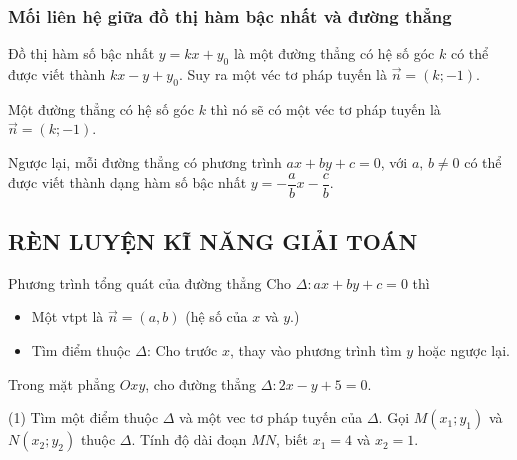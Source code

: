 \subsubsection{Mối liên hệ giữa đồ thị hàm bậc nhất và đường thẳng}
\begin{listEX}[1]
	\item [\ding{172}] Đồ thị hàm số bậc nhất $y=kx+y_0$ là một đường thẳng có hệ số góc $k$ có thể được viết thành $kx-y+y_0$. Suy ra một véc tơ pháp tuyến là $\vec{n}=(k;-1)$.
	\begin{boxdn}
		 Một đường thẳng có hệ số góc $k$ thì nó sẽ có một véc tơ pháp tuyến là $\vec{n}=(k;-1)$.
	\end{boxdn}
	\item [\ding{173}] Ngược lại, mỗi đường thẳng có phương trình $ax+by+c=0$, với $a,\,b \ne 0$ có thể được viết thành dạng hàm số bậc nhất $y=-\dfrac{a}{b}x-\dfrac{c}{b}$.
\end{listEX}
\subsection{RÈN LUYỆN KĨ NĂNG GIẢI TOÁN}

\begin{dang}{Phương trình tổng quát của đường thẳng}
	 Cho $\Delta \colon ax+by+c=0$ thì
	\begin{itemize}
		\item [$\bullet$] Một vtpt là $\overrightarrow{n}=(a,b)$ (hệ số của $x$ và $y$.)
		\item [$\bullet$] Tìm điểm thuộc $\Delta$: Cho trước $x$, thay vào phương trình tìm $y$ hoặc ngược lại.
	\end{itemize}
\end{dang}
\begin{vd}
	Trong mặt phẳng $Oxy$, cho đường thẳng $\Delta \colon 2x-y+5=0$.
	\begin{tasks}(1)
		\task Tìm một điểm thuộc $\Delta$ và một vec tơ pháp tuyến của $\Delta$.
		\task Gọi $M(x_1;y_1)$ và $N(x_2;y_2)$ thuộc $\Delta$. Tính độ dài đoạn $MN$, biết $x_1=4$ và $x_2=1$.
	\end{tasks}
	
\end{vd}

